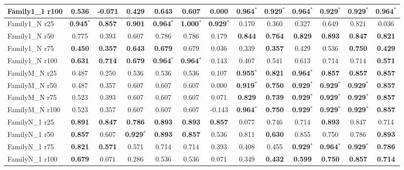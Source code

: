 \begin{table}[t]
{\begin{tabular}{l||cccccc||cccccc}
Family1\_1 r100 & 0.536 & -0.071 & 0.429 & 0.643 & 0.607 & 0.000 & \textbf{0.964}$^*$ & \textbf{0.929}$^*$ & \textbf{0.964}$^*$ & \textbf{0.929}$^*$ & \textbf{0.929}$^*$ & \textbf{0.964}$^*$ \\
\hline
Family1\_N r25 & \textbf{0.945}$^*$ & \textbf{0.857} & \textbf{0.901} & \textbf{0.964}$^*$ & \textbf{1.000}$^*$ & \textbf{0.929}$^*$ & 0.170 & 0.360 & 0.327 & 0.649 & 0.821 & 0.036 \\
Family1\_N r50 & 0.775 & 0.393 & 0.607 & 0.786 & 0.786 & 0.179 & \textbf{0.844} & \textbf{0.764} & \textbf{0.829} & \textbf{0.893} & \textbf{0.847} & \textbf{0.821} \\
Family1\_N r75 & \textbf{0.450} & \textbf{0.357} & \textbf{0.643} & \textbf{0.679} & 0.679 & 0.036 & 0.339 & \textbf{0.357} & 0.429 & 0.536 & \textbf{0.750} & \textbf{0.429} \\
Family1\_N r100 & \textbf{0.631} & \textbf{0.714} & \textbf{0.679} & \textbf{0.964}$^*$ & \textbf{0.964}$^*$ & 0.143 & 0.407 & 0.541 & 0.613 & 0.714 & 0.714 & \textbf{0.571} \\
\hline
FamilyM\_N r25 & 0.487 & 0.250 & 0.536 & 0.536 & 0.536 & 0.107 & \textbf{0.955}$^*$ & \textbf{0.821} & \textbf{0.964}$^*$ & \textbf{0.857} & \textbf{0.857} & \textbf{0.857} \\
FamilyM\_N r50 & 0.487 & 0.357 & 0.607 & 0.607 & 0.607 & 0.000 & \textbf{0.919}$^*$ & \textbf{0.750} & \textbf{0.929}$^*$ & \textbf{0.929}$^*$ & \textbf{0.929}$^*$ & \textbf{0.857} \\
FamilyM\_N r75 & 0.523 & 0.393 & 0.607 & 0.607 & 0.607 & 0.071 & \textbf{0.829} & \textbf{0.739} & \textbf{0.929}$^*$ & \textbf{0.929}$^*$ & \textbf{0.929}$^*$ & \textbf{0.857} \\
FamilyM\_N r100 & 0.523 & 0.357 & 0.607 & 0.607 & 0.607 & -0.143 & \textbf{0.964}$^*$ & \textbf{0.750} & \textbf{0.929}$^*$ & \textbf{0.929}$^*$ & \textbf{0.929}$^*$ & \textbf{0.857} \\
\hline
FamilyN\_1 r25 & \textbf{0.891} & \textbf{0.847} & \textbf{0.786} & \textbf{0.893} & \textbf{0.893} & \textbf{0.857} & 0.077 & 0.746 & 0.714 & \textbf{0.893} & 0.847 & 0.714 \\
FamilyN\_1 r50 & \textbf{0.857} & 0.607 & \textbf{0.929}$^*$ & \textbf{0.893} & \textbf{0.857} & 0.536 & 0.811 & \textbf{0.630} & 0.855 & 0.750 & 0.786 & \textbf{0.893} \\
FamilyN\_1 r75 & \textbf{0.821} & \textbf{0.571} & 0.571 & 0.714 & 0.714 & 0.393 & 0.408 & 0.455 & \textbf{0.929}$^*$ & \textbf{0.964}$^*$ & \textbf{0.929}$^*$ & \textbf{0.786} \\
FamilyN\_1 r100 & \textbf{0.679} & 0.071 & 0.286 & 0.536 & 0.536 & 0.071 & 0.349 & \textbf{0.432} & \textbf{0.599} & \textbf{0.750} & \textbf{0.857} & \textbf{0.714} \\
\hline
\end{tabular}%
}
\end{table}
